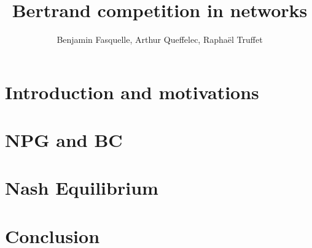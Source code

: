 \documentclass{beamer}
\title{Bertrand competition in networks}
\author{Benjamin Fasquelle, Arthur Queffelec, Raphaël Truffet}
\institute{École Normale Supérieure de Rennes, département Informatique et Télécommunications}
\begin{document}



  \begin{frame}
  \titlepage
  \end{frame}


\begin{frame}
  \tableofcontents
  \end{frame}


\section{Introduction and motivations}




\section{NPG and BC}


\section{Nash Equilibrium}


\section{Conclusion}
\end{document}
